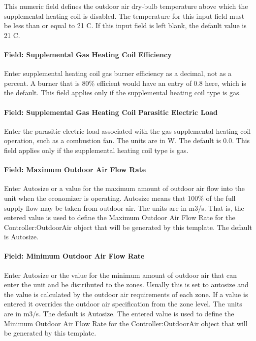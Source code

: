 This numeric field defines the outdoor air dry-bulb temperature above which the supplemental heating coil is disabled. The temperature for this input field must be less than or equal to 21 C. If this input field is left blank, the default value is 21 C.

\paragraph{Field: Supplemental Gas Heating Coil Efficiency}\label{field-supplemental-gas-heating-coil-efficiency-2}

Enter supplemental heating coil gas burner efficiency as a decimal, not as a percent. A burner that is 80\% efficient would have an entry of 0.8 here, which is the default. This field applies only if the supplemental heating coil type is gas.

\paragraph{Field: Supplemental Gas Heating Coil Parasitic Electric Load}\label{field-supplemental-gas-heating-coil-parasitic-electric-load-2}

Enter the parasitic electric load associated with the gas supplemental heating coil operation, such as a combustion fan. The units are in W. The default is 0.0. This field applies only if the supplemental heating coil type is gas.

\paragraph{Field: Maximum Outdoor Air Flow Rate}\label{field-maximum-outdoor-air-flow-rate-2}

Enter Autosize or a value for the maximum amount of outdoor air flow into the unit when the economizer is operating. Autosize means that 100\% of the full supply flow may be taken from outdoor air. The units are in m3/s. That is, the entered value is used to define the Maximum Outdoor Air Flow Rate for the Controller:OutdoorAir object that will be generated by this template. The default is Autosize.

\paragraph{Field: Minimum Outdoor Air Flow Rate}\label{field-minimum-outdoor-air-flow-rate-2}

Enter Autosize or the value for the minimum amount of outdoor air that can enter the unit and be distributed to the zones. Usually this is set to autosize and the value is calculated by the outdoor air requirements of each zone. If a value is entered it overrides the outdoor air specification from the zone level. The units are in m3/s. The default is Autosize. The entered value is used to define the Minimum Outdoor Air Flow Rate for the Controller:OutdoorAir object that will be generated by this template.

